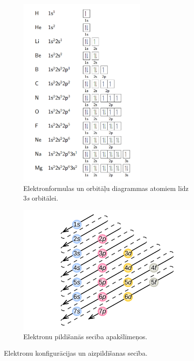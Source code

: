 \documentclass[12pt,a4paper]{article}
\begin{document}
\begin{figure}[H]
    \centering
    \begin{subfigure}[b]{0.49\textwidth}
        \centering
        \includegraphics[width=0.7\textwidth]{atteli/konfiguracijas.png}
        \caption{Elektronformulas un orbitāļu diagrammas atomiem līdz 3\textit{s} orbitālei.}
        \label{fig:konfiguracijas}
    \end{subfigure}
    \hfill
    \begin{subfigure}[b]{0.49\textwidth}
        \centering
        \includegraphics[width=\textwidth]{atteli/steps.jpg}
        \caption{Elektronu pildīšanās secība apakšlīmeņos.}
        \label{fig:steps}
    \end{subfigure}
    \caption{Elektronu konfigurācijas un aizpildīšanas secība.}
\end{figure}
\end{document}
